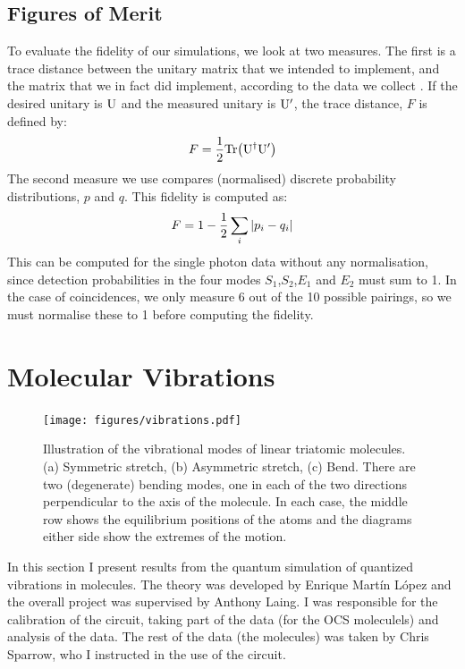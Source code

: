 \subsection{Figures of Merit}

To evaluate the fidelity of our simulations, we look at two measures. The first
is a trace distance between the unitary matrix that we intended to implement,
and the matrix that we in fact did implement, according to the data we collect
\cite{sst}. If the desired unitary is \(\mathrm{U}\) and the measured unitary
is \(\mathrm{U^{\prime}}\), the trace distance, \(F\) is defined by:
\[F=\frac{1}{2}\mathrm{Tr}\!\left(\mathrm{U}^{\dagger}{\mathrm{U}^{\prime}}\right)\]
The second measure we use compares (normalised) discrete probability
distributions, \(p\) and \(q\). This fidelity is computed as:
\[F=1-\frac{1}{2}\sum_{i}\left|p_{i}-q_{i}\right|\]
This can be computed for the single photon data without any normalisation, since
detection probabilities in the four modes \(S_1\),\(S_2\),\(E_1\) and \(E_2\)
must sum to 1. In the case of coincidences, we only measure 6 out of the 10
possible pairings, so we must normalise these to 1 before computing the
fidelity.

\section{Molecular Vibrations}
\label{sec:Molecules}
\begin{figure}[h]
  \centering
  \texttt{[image: figures/vibrations.pdf]}
  \caption[Vibrational modes of linear triatomic molecules]
  {Illustration of the vibrational modes of linear triatomic molecules. (a)
  Symmetric stretch, (b) Asymmetric stretch, (c) Bend. There are two
  (degenerate) bending modes, one in each of the two directions perpendicular to
  the axis of the molecule. In each case, the middle row shows the equilibrium
  positions of the atoms and the diagrams either side show the extremes of the
  motion.}
  \label{fig:vibrations}
\end{figure}
In this section I present results from the quantum simulation of quantized
vibrations in molecules. The theory was developed by Enrique Mart\'in L\'opez
and the overall project was supervised by Anthony Laing. I was responsible for
the calibration of the circuit, taking part of the data (for the OCS moleculels)
and analysis of the data. The rest of the data (the \co{} molecules) was taken
by Chris Sparrow, who I instructed in the use of the circuit.

